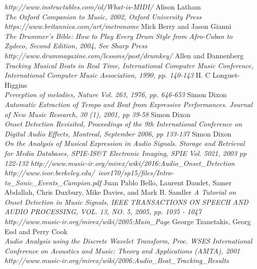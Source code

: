 \documentclass[a4paper, 11pt]{article}
\begin{document}
\newpage
\begin{thebibliography}{99}
\textit{http://www.instructables.com/id/What-is-MIDI/}
Alison Latham\\
\textit{The Oxford Companion to Music, 2002, Oxford University Press}
\textit{https://www.britannica.com/art/metronome}
Mick Berry and Jason Gianni\\
\textit{The Drummer's Bible: How to Play Every Drum Style from Afro-Cuban to Zydeco, Second Edition, 2004, See Sharp Press}
\textit{http://www.drummagazine.com/lessons/post/drumkey/}
Allen and Dannenberg\\
\textit{Tracking Musical Beats in Real Time, International Computer Music Conference, International Computer Music Association, 1990, pp. 140-143}
H. C Longuet-Higgins\\
\textit{Perception of melodies, Nature Vol. 263, 1976, pp. 646-653}
Simon Dixon\\
\textit{Automatic Extraction of Tempo and Beat from Expressive Performances. Journal of New Music Research, 30 (1), 2001, pp 39-58}
Simon Dixon\\
\textit{Onset Detection Revisited, Proceedings of the 9th International Conference on Digital Audio Effects, Montreal, September 2006, pp 133-137}
Simon Dixon\\
\textit{On the Analysis of Musical Expression in Audio Signals. Storage and Retrieval for Media Databases, SPIE-IS\&T Electronic Imaging, SPIE Vol. 5021, 2003 pp 122-132}
\textit{http://www.music-ir.org/mirex/wiki/2016:Audio\_Onset\_Detection}
\textit{http://www.ieor.berkeley.edu/~ieor170/sp15/files/Intro-to\_Sonic\_Events\_Campion.pdf}
Juan Pablo Bello, Laurent Daudet, Samer Abdallah, Chris Duxbury, Mike Davies, and Mark B. Sandler 
\textit{A Tutorial on Onset Detection in Music Signals, IEEE TRANSACTIONS ON SPEECH AND AUDIO PROCESSING, VOL. 13, NO. 5, 2005, pp. 1035 - 1047}
\textit{http://www.music-ir.org/mirex/wiki/2005:Main\_Page}
George Tzanetakis, Georg Essl and Perry Cook\\
\textit{Audio Analysis using the Discrete Wavelet Transform, Proc. WSES International Conference on Acoustics and Music: Theory and Applications (AMTA), 2001}
\textit{http://www.music-ir.org/mirex/wiki/2006:Audio\_Beat\_Tracking\_Results}

\end{thebibliography}
\end{document}

